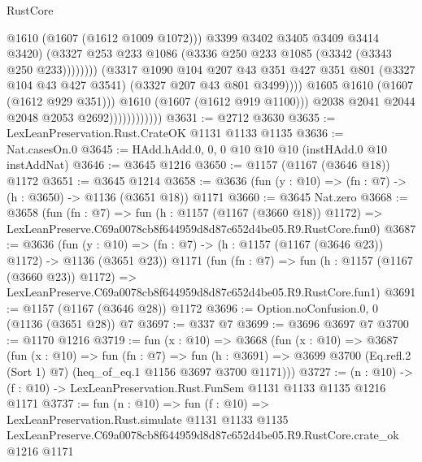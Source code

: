 \begin{lexlean}{RustCore}
\begin{coremodule}
                                                @1610
                                                (@1607 (@1612 @1009 @1072)))
                                              @3399
                                              @3402
                                              @3405
                                              @3409
                                              @3414
                                              @3420)
                                            (@3327
                                              @253
                                              @233
                                              @1086
                                              (@3336 @250 @233 @1085 (@3342 (@3343 @250 @233))))))))
                                    (@3317
                                      @1090
                                      @104
                                      @207
                                      @43
                                      @351
                                      @427
                                      @351
                                      @801
                                      (@3327 @104 @43 @427 @3541)
                                      (@3327 @207 @43 @801 @3499))))
                                @1605
                                @1610
                                (@1607 (@1612 @929 @351)))
                              @1610
                              (@1607 (@1612 @919 @1100)))
                            @2038
                            @2041
                            @2044
                            @2048
                            @2053
                            @2692))))))))))))
@3631 := @2712 @3630
@3635 := LexLeanPreservation.Rust.CrateOK @1131 @1133 @1135
@3636 := Nat.casesOn.{0}
@3645 := HAdd.hAdd.{0, 0, 0} @10 @10 @10 (instHAdd.{0} @10 instAddNat)
@3646 := @3645 @1216
@3650 := @1157 (@1167 (@3646 @18)) @1172
@3651 := @3645 @1214
@3658 := @3636 (fun (y : @10) => (fn : @7) -> (h : @3650) -> @1136 (@3651 @18)) @1171
@3660 := @3645 Nat.zero
@3668 := @3658
    (fun (fn : @7) =>
    fun (h : @1157 (@1167 (@3660 @18)) @1172) =>
    LexLeanPreserve.C69a0078cb8f644959d8d87c652d4be05.R9.RustCore.fun0)
@3687 := @3636
    (fun (y : @10) => (fn : @7) -> (h : @1157 (@1167 (@3646 @23)) @1172) -> @1136 (@3651 @23))
    @1171
    (fun (fn : @7) =>
    fun (h : @1157 (@1167 (@3660 @23)) @1172) =>
    LexLeanPreserve.C69a0078cb8f644959d8d87c652d4be05.R9.RustCore.fun1)
@3691 := @1157 (@1167 (@3646 @28)) @1172
@3696 := Option.noConfusion.{0, 0} (@1136 (@3651 @28)) @7
@3697 := @337 @7
@3699 := @3696 @3697 @7
@3700 := @1170 @1216
@3719 := fun (x : @10) =>
  @3668
    (fun (x : @10) =>
    @3687
      (fun (x : @10) =>
      fun (fn : @7) =>
      fun (h : @3691) =>
      @3699 @3700 (Eq.refl.{2} (Sort 1) @7) (heq_of_eq.{1} @1156 @3697 @3700 @1171)))
@3727 := (n : @10) -> (f : @10) -> LexLeanPreservation.Rust.FunSem @1131 @1133 @1135 @1216 @1171
@3737 := fun (n : @10) =>
  fun (f : @10) =>
  LexLeanPreservation.Rust.simulate
    @1131
    @1133
    @1135
    LexLeanPreserve.C69a0078cb8f644959d8d87c652d4be05.R9.RustCore.crate_ok
    @1216
    @1171
\end{coremodule}
\end{lexlean}
